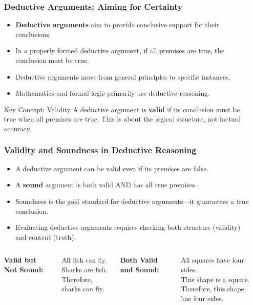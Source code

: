 \documentclass{beamer}
\begin{document}
\begin{frame}
    \frametitle{Deductive Arguments: Aiming for Certainty}
    \begin{itemize}
        \item \textbf{Deductive arguments} aim to provide conclusive support for their conclusions.
        \item In a properly formed deductive argument, if all premises are true, the conclusion must be true.
        \item Deductive arguments move from general principles to specific instances.
        \item Mathematics and formal logic primarily use deductive reasoning.
    \end{itemize}
    
    \begin{alertblock}{Key Concept: Validity}
        A deductive argument is \textbf{valid} if its conclusion must be true when all premises are true. This is about the logical structure, not factual accuracy.
    \end{alertblock}
\end{frame}

\begin{frame}
    \frametitle{Validity and Soundness in Deductive Reasoning}
    \begin{itemize}
        \item A deductive argument can be valid even if its premises are false.
        \item A \textbf{sound} argument is both valid AND has all true premises.
        \item Soundness is the gold standard for deductive arguments—it guarantees a true conclusion.
        \item Evaluating deductive arguments requires checking both structure (validity) and content (truth).
    \end{itemize}
    
    \begin{columns}[t]
        \textbf{Valid but Not Sound:}
        
        All fish can fly.\\
        Sharks are fish.\\
        Therefore, sharks can fly.
        
        \textbf{Both Valid and Sound:}
        
        All squares have four sides.\\
        This shape is a square.\\
        Therefore, this shape has four sides.
    \end{columns}
\end{frame}
\end{document}
